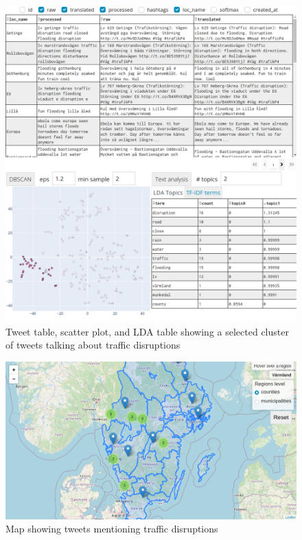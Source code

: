 \begin{figure}[H]
  \begin{center}
    \includegraphics[width=\columnwidth]{./images/4days_text_analysis_traffic_disruption.png}
  \end{center}
  \caption{Tweet table, scatter plot, and LDA table showing a selected cluster of tweets
  talking about traffic disruptions}
  \label{fig:4days_text_analysis_traffic_disruption}
\end{figure}

\begin{figure}[H]
  \begin{center}
    \includegraphics[width=\columnwidth]{./images/4days_text_analysis_traffic_disruption_map.png}
  \end{center}
  \caption{Map showing tweets mentioning traffic disruptions}
  \label{fig:4days_text_analysis_traffic_disruption_map}
\end{figure}
